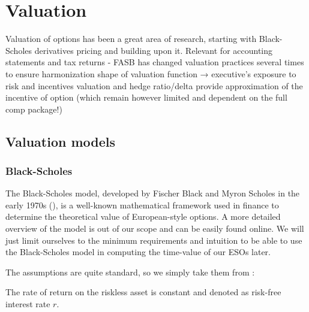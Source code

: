 \section{Valuation}
Valuation of options has been a great area of research, starting with Black-Scholes derivatives pricing and building upon it.
    Relevant for accounting statements and tax returns - FASB has changed valuation practices several times to ensure harmonization
    shape of valuation function → executive's exposure to risk and incentives
    valuation and hedge ratio/delta provide approximation of the incentive of option (which remain however limited and dependent on the full comp package!)




\subsection{Valuation models} 

\subsubsection*{Black-Scholes}
    The Black-Scholes model, developed by Fischer Black and Myron Scholes in the early 1970s (\cite{black1973pricing}), is a well-known mathematical framework used in finance to determine the theoretical value of European-style options. A more detailed overview of the model is out of our scope and can be easily found online. We will just limit ourselves to the minimum requirements and intuition to be able to use the Black-Scholes model in computing the time-value of our ESOs later.
    
    The assumptions are quite standard, so we simply take them from \cite{wiki:blackscholes}:

    \begin{assumption}
        \label{ass:bs_1}
        The rate of return on the riskless asset is constant and denoted as risk-free interest rate $r$.
    \end{assumption}
    

